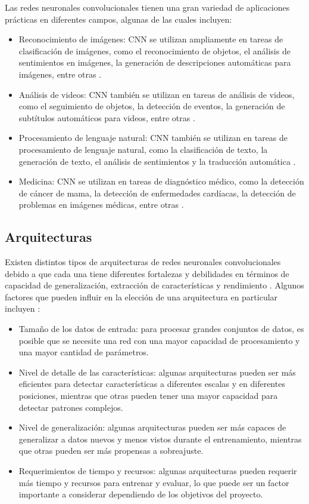 Las redes neuronales convolucionales tienen una gran variedad de aplicaciones prácticas en diferentes campos, algunas
de las cuales incluyen:
\begin{itemize}
  \item Reconocimiento de imágenes: CNN se utilizan ampliamente en tareas de clasificación de imágenes, como el reconocimiento
        de objetos, el análisis de sentimientos en imágenes, la generación de descripciones automáticas para imágenes, entre
        otras \parencite{krizhevsky2017imagenet}.
  \item Análisis de videos: CNN también se utilizan en tareas de análisis de videos, como el seguimiento de objetos, la
        detección de eventos, la generación de subtítulos automáticos para videos, entre otras \parencite{simonyan2014twostream}.
  \item Procesamiento de lenguaje natural: CNN también se utilizan en tareas de procesamiento de lenguaje natural, como la
        clasificación de texto, la generación de texto, el análisis de sentimientos y la traducción automática \parencite{bugnon2020dl4papers}.
  \item Medicina: CNN se utilizan en tareas de diagnóstico médico, como la detección de cáncer de mama, la detección de
        enfermedades cardíacas, la detección de problemas en imágenes médicas, entre otras \parencite{wang2016deep}.
\end{itemize}

\subsection{Arquitecturas}

Existen distintos tipos de arquitecturas de redes neuronales convolucionales debido a que cada una tiene diferentes
fortalezas y debilidades en términos de capacidad de generalización, extracción de características y rendimiento \parencite{lecun2015deep}. Algunos factores que pueden influir en la elección de una arquitectura en particular incluyen \parencite{he2016deep}:

\begin{itemize}
  \item Tamaño de los datos de entrada: para procesar grandes conjuntos de datos, es posible que se necesite una red con una
        mayor capacidad de procesamiento y una mayor cantidad de parámetros.
  \item Nivel de detalle de las características: algunas arquitecturas pueden ser más eficientes para detectar características
        a diferentes escalas y en diferentes posiciones, mientras que otras pueden tener una mayor capacidad para detectar
        patrones complejos.
  \item Nivel de generalización: algunas arquitecturas pueden ser más capaces de generalizar a datos nuevos y menos vistos
        durante el entrenamiento, mientras que otras pueden ser más propensas a sobreajuste.
  \item Requerimientos de tiempo y recursos: algunas arquitecturas pueden requerir más tiempo y recursos para entrenar y
        evaluar, lo que puede ser un factor importante a considerar dependiendo de los objetivos del proyecto.
\end{itemize}

